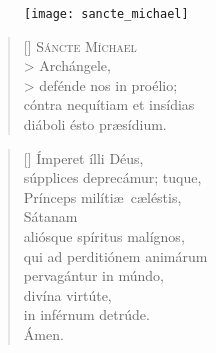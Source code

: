\documentclass[omni.tex]{subfiles}
\begin{document}
\begin{figure}
{\begin{center}
    \texttt{[image: sancte\_michael]}
\end{center}}
\end{figure}

\settowidth{\versewidth}{Et ne nos ind\'ucas in tentati\'onem}

\begin{verse}[\versewidth]
\lettrine[lhang=1.0,nindent=0em]{S}{\'ancte M\'ichael} \\>
Arch\'angele, \\>
def\'ende nos in pro\'elio; \\
c\'ontra nequ\'itiam et ins\'idias \\
di\'aboli \'esto pr\ae s\'idium.
\end{verse}

\begin{verse}[\versewidth]
\'Imperet \'illi D\'eus, \\
s\'upplices deprec\'amur; tuque, \\
Pr\'inceps mil\'iti\ae\ c\ae l\'estis, \\
S\'atanam \\
ali\'osque sp\'iritus mal\'ignos, \\
qui ad perditi\'onem anim\'arum \\
pervag\'antur in m\'undo, \\
div\'ina virt\'ute, \\
in inf\'ernum detr\'ude. \\
\'Amen. \\[0\baselineskip]
\end{verse}

\pagebreak
\end{document}
